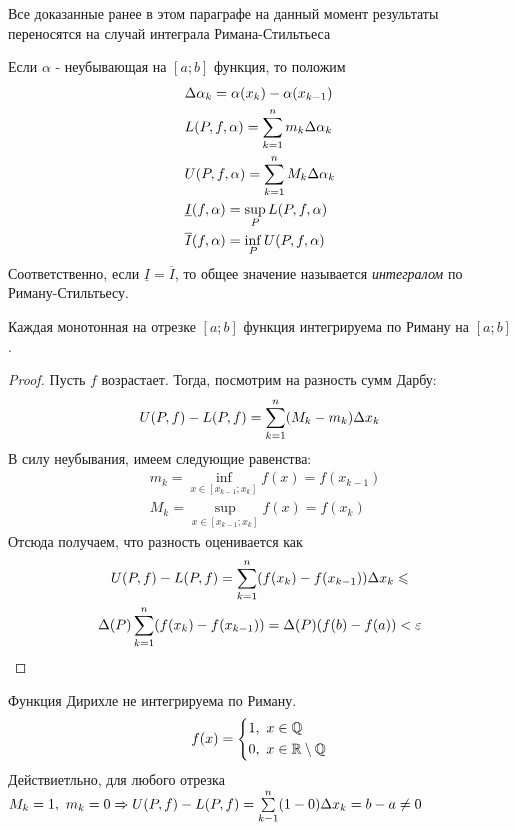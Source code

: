 \begin{note}
	Все доказанные ранее в этом параграфе на данный момент результаты переносятся на случай интеграла Римана-Стильтьеса
\end{note}

\begin{definition}
	Если $\alpha$ - неубывающая на $[a; b]$ функция, то положим
	\begin{align*}
		&{\Delta \alpha_k = \alpha(x_k) - \alpha(x_{k - 1})}
		\\
		&{L(P, f, \alpha) = \sum\limits_{k = 1}^n m_k \Delta \alpha_k}
		\\
		&{U(P, f, \alpha) = \sum\limits_{k = 1}^n M_k \Delta \alpha_k}
		\\
		&{\underline{I}(f, \alpha) = \sup\limits_P L(P, f, \alpha)}
		\\
		&{\overline{I}(f, \alpha) = \inf\limits_P U(P, f, \alpha)}
	\end{align*}
	Соответственно, если $\underline{I} = \overline{I}$, то общее значение называется \textit{интегралом} по Риману-Стильтьесу.
\end{definition}

\begin{theorem}
	Каждая монотонная на отрезке $[a; b]$ функция интегрируема по Риману на $[a; b]$.
\end{theorem}

\begin{proof}
	Пусть $f$ возрастает. Тогда, посмотрим на разность сумм Дарбу:
	\[
		U(P, f) - L(P, f) = \sum\limits_{k = 1}^n (M_k - m_k) \Delta x_k
	\]
	В силу неубывания, имеем следующие равенства:
	\begin{align*}
		&{m_k = \inf\limits_{x \in [x_{k - 1}; x_k]} f(x) = f(x_{k - 1})}
		\\
		&{M_k = \sup\limits_{x \in [x_{k - 1}; x_k]} f(x) = f(x_k)}
	\end{align*}
	Отсюда получаем, что разность оценивается как
	\begin{multline*}
		U(P, f) - L(P, f) = \sum\limits_{k = 1}^n (f(x_k) - f(x_{k - 1})) \Delta x_k \leqslant
		\\
		\Delta(P) \sum\limits_{k = 1}^n (f(x_k) - f(x_{k - 1})) = \Delta(P)(f(b) - f(a)) < \varepsilon
	\end{multline*}
\end{proof}

\begin{example}
	Функция Дирихле не интегрируема по Риману.
	\[
		f(x) = \left\{\begin{aligned}
			&1,\ x\in \mathbb{Q}
			\\
			&0,\ x\in \mathbb{R} \setminus \mathbb{Q}
		\end{aligned}\right.
	\]
	Действиетльно, для любого отрезка $M_k = 1,\ m_k = 0 \Rightarrow U(P, f) - L(P, f) = \sum\limits_{k - 1}^n(1 - 0)\Delta x_k = b - a \neq 0$
\end{example}

